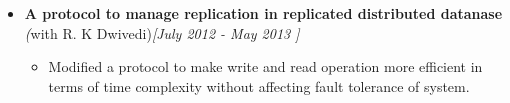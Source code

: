 \begin{itemize}

	\item \textbf{A protocol to manage replication in replicated distributed datanase}  \hfill \emph(with R. K Dwivedi)\hfill \emph{[July 2012 - May 2013 ]} \\[-0.6cm]
	\begin{itemize}
	      \item Modified a protocol to make write and read operation more efficient in terms of time complexity without affecting fault tolerance of system. \\[-0.6cm]
	\end{itemize}


\end{itemize}

